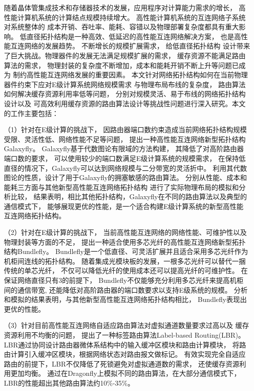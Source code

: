 \begin{cabstract}
  随着晶体管集成技术和存储器技术的发展，应用程序对计算能力需求的增长，
  高性能计算机系统的计算结点规模持续增大。
  高性能计算机系统的互连网络子系统对系统整体的
  成本开销、吞吐率、能耗、容错以及物理部署复杂度都具有重大影响。
  低直径拓扑结构是一种高效、低延迟的高性能互连网络解决方案，
  也是高性能互连网络的发展趋势。
  不断增长的规模扩展需求，
  给低直径拓扑结构
  设计带来了巨大挑战。物理器件的发展无法满足规模扩展的需求，
  缓存资源不能满足路由算法的需求，
  物理封装的复杂度不断增加，成本和能耗开销不断上升等问题已成为
  制约高性能互连网络发展的重要因素。
  本文针对网络拓扑结构如何在当前物理器件约束下应对E级计算系统网络规模需求
  与物理布局布线的复杂度，
  路由算法如何解决缓存资源利用率低等问题，
  分别对规模灵活、易于布线的网络拓扑结构设计以及
  可高效利用缓存资源的路由算法设计等挑战性问题进行深入研究。本文的工作主要包括：

  （1）针对在E级计算的挑战下，
  因路由器端口数约束造成当前网络拓扑结构规模受限、灵活性低、网络性能不足等问题，
  提出一种高性能互连网络新型拓扑结构Galaxyfly。
  Galaxyfly基于代数图论有限域的方法构建，
  其降低了对高阶路由器端口数的要求，
  可以使用较少的端口数满足E级计算系统的规模需求，
  在保持低直径的情况下，Galaxyfly可以达到网络规模与二分带宽的灵活折中。
  利用其代数图论的性质，设计了用于Galaxyfly的拥塞敏感的路由算法。
  分别从性能、成本和能耗三方面与其他新型高性能互连网络拓扑结构
  进行了实际物理布局的模拟和分析比较，
  结果表明，相比其他拓扑结构，Galaxyfly在不同的路由算法以及典型的通信模式下，
  能够展现更优的性能，是一个适合构建E级计算系统的新型高性能互连网络拓扑结构。

  （2）针对在E级计算的挑战下，
  当前高性能互连网络的网络性能、可维护性以及物理封装等方面的不足，
  提出一种适合使用多芯光纤的高性能互连网络新型拓扑结构Bundlefly。
  Bundlefly是一个低直径、可灵活扩展并且适合采用多芯光纤作为机柜间连线的拓扑结构。
  随着集成光模块板的发展，一根多芯光纤可以替代一捆传统的单芯光纤，
  不仅可以降低光纤的使用成本还可以提高光纤的可维护性。
  在保证网络直径只有3的前提下，
  Bundlefly不仅能够充分利用多芯光纤来提高机柜间的通信带宽,
  还能降低对高阶路由器的端口数要求以支持E级系统的规模。
  分析和模拟的结果表明，与其他新型高性能互连网络拓扑结构相比，
  Bundlefly表现出更优的性能。

  （3）针对目前高性能互连网络自适应路由算法对虚拟通道数量要求过高以及
  缓存资源利用不均衡的问题，
  提出了一种标签路由算法Label-based Routing(LBR)。
  LBR通过协同设计路由器微体系结构中的输入缓冲区模块和路由计算模块，
  将路由计算引入缓冲区模块，根据网络状态对路由报文做标记。
  有效实现完全自适应路由的前提下，LBR不仅降低了死锁避免对虚拟通道数的需求，
  还使缓存资源利用更加均衡。
  通过在Dragonfly上模拟不同的路由算法，在大部分通信模式下，
  LBR的性能超出其他路由算法约10\%-35\%。



\end{cabstract}

